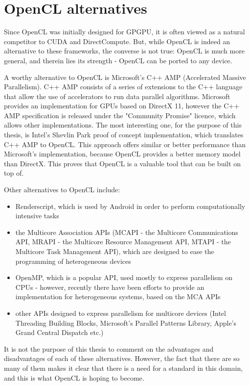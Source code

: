 \section{OpenCL alternatives}
\label{section:oclalternatives}
Since OpenCL was initially designed for GPGPU, it is often viewed as a natural competitor to CUDA and DirectCompute. But, while OpenCL is indeed an alternative to these frameworks, the converse is not true: OpenCL is much more general, and therein lies its strength - OpenCL can be ported to any device.

A worthy alternative to OpenCL is Microsoft's C++ AMP (Accelerated Massive Parallelism)\cite{cppamp}. C++ AMP consists of a series of extensions to the C++ language that allow the use of accelerators to run data parallel algorithms. Microsoft provides an implementation for GPUs based on DirectX 11, however the C++ AMP specification is released under the "Community Promise" licence, which allows other implementations. The most interesting one, for the purpose of this thesis, is Intel's Shevlin Park proof of concept implementation, which translates C++ AMP to OpenCL. This approach offers similar or better performance than Microsoft's implementation\cite{shevlin}, because OpenCL provides a better memory model than DirectX. This proves that OpenCL is a valuable tool that can be built on top of.

Other alternatives to OpenCL include:
\begin{itemize}
\item Renderscript, which is used by Android in order to perform computationally intensive tasks
\item the Multicore Association APIs (MCAPI - the Multicore Communications API, MRAPI - the Multicore Resource Management API, MTAPI - the Multicore Task Management API), which are designed to ease the programming of heterogeneous devices
\item OpenMP, which is a popular API, used mostly to express parallelism on CPUs - however, recently there have been efforts to provide an implementation for heterogeneous systems, based on the MCA APIs\cite{libeomp}
\item other APIs designed to express parallelism for multicore devices (Intel Threading Building Blocks, Microsoft's Parallel Patterns Library, Apple's Grand Central Dispatch etc.)
\end{itemize}

It is not the purpose of this thesis to comment on the advantages and disadvantages of each of these alternatives. However, the fact that there are so many of them makes it clear that there is a need for a standard in this domain, and this is what OpenCL is hoping to become. 


